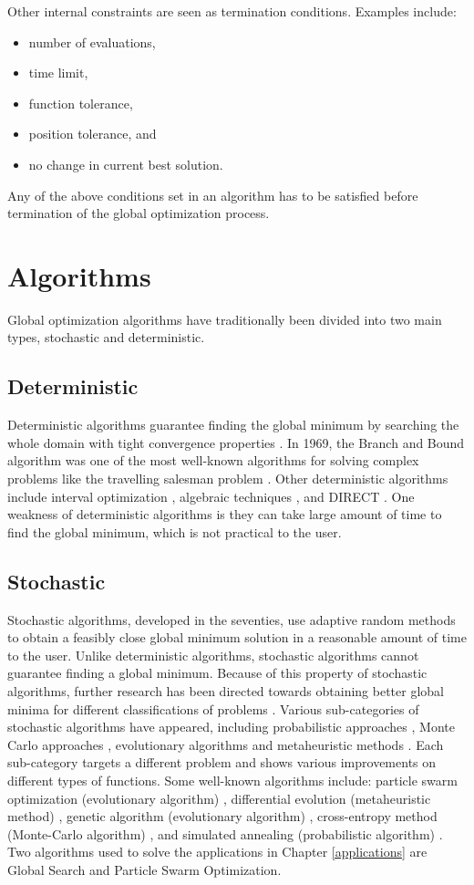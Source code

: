 Other internal constraints are seen as termination conditions. Examples include:
\begin{itemize}
    \item number of evaluations,
    \item time limit,
    \item function tolerance,
    \item position tolerance, and
    \item no change in current best solution.
\end{itemize}

Any of the above conditions set in an algorithm has to be satisfied before termination of the global optimization process. 

\section{Algorithms}
Global optimization algorithms have traditionally been divided into two main types, stochastic and deterministic. 
\subsection{Deterministic}
Deterministic algorithms guarantee finding the global minimum by searching the whole
domain with tight convergence properties \cite{Pinter2002}. In 1969, the Branch and Bound algorithm \cite{Liberti2000} was one of the most well-known algorithms for solving complex problems like the travelling salesman problem \cite{Liberti2000}. Other deterministic algorithms include interval optimization \cite{Accary2008}, algebraic techniques \cite{Veltman1972}, and DIRECT \cite{Jones1993}. One weakness of deterministic algorithms is they can take large amount of time to find the global minimum, which is not practical to the user. 
\subsection{Stochastic}
Stochastic algorithms, developed in the seventies, use adaptive random methods to obtain a feasibly close global minimum solution in a reasonable amount of time to the user. Unlike deterministic algorithms, stochastic algorithms cannot guarantee finding a global minimum. Because of this property of stochastic algorithms, further research has been directed towards obtaining better global minima for different classifications of problems \cite{Aguiar,Pinter2002}. Various sub-categories of stochastic algorithms have appeared, including probabilistic approaches \cite{Aguiar}, Monte Carlo approaches \cite{Aguiar}, evolutionary algorithms \cite{Aguiar} and metaheuristic methods \cite{Can2015}. Each sub-category targets a different problem
and shows various improvements on different types of functions. Some well-known algorithms include: particle swarm optimization (evolutionary algorithm) \cite{Kennedy1995}, differential evolution (metaheuristic method) \cite{Aguiar}, genetic algorithm (evolutionary algorithm) \cite{Aguiar}, cross-entropy method (Monte-Carlo algorithm) \cite{Aguiar}, and simulated annealing (probabilistic algorithm) \cite{Aguiar}. Two algorithms used to solve the applications in Chapter \ref{applications} are Global Search and Particle Swarm Optimization.
